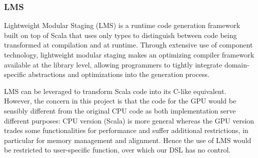 \subsubsection{LMS}
Lightweight Modular Staging (LMS) is a runtime code generation framework built on top of Scala that uses only types to distinguish between code being transformed at compilation and at runtime. Through extensive use of component technology, lightweight modular staging makes an optimizing compiler framework available at the library level, allowing programmers to tightly integrate domain-specific abstractions and optimizations into the generation process.

LMS can be leveraged to transform Scala code into its C-like equivalent. However, the concern in this project is that the code for the GPU would be sensibly different from the original CPU code as both implementation serve different purposes: CPU version (Scala) is more general whereas the GPU version trades some functionalities for performance and suffer additional restrictions, in particular for memory management and alignment. Hence the use of LMS would be restricted to user-specific function, over which our DSL has no control.
